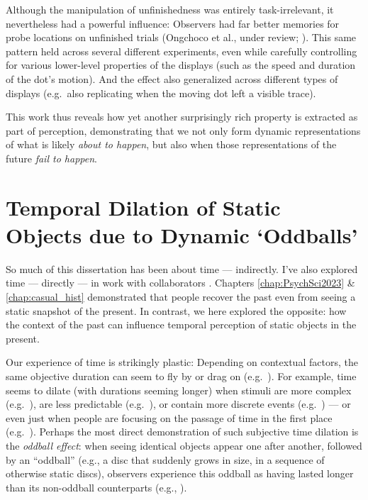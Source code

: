 Although the manipulation of unfinishedness was entirely task-irrelevant, it nevertheless had a powerful influence: Observers had far better memories for probe locations on unfinished trials (Ongchoco et al., under review; \cite{ongchoco_unfinishedness_2023}).  This same pattern held across several different experiments, even while carefully controlling for various lower-level properties of the displays (such as the speed and duration of the dot's motion). And the effect also generalized across different types of displays (e.g.~also replicating when the moving dot left a visible trace).  

This work thus reveals how yet another surprisingly rich property is extracted as part of perception, demonstrating that we not only form dynamic representations of what is likely \textit{about to happen}, but also when those representations of the future \textit{fail to happen}.  

\section{Temporal Dilation of Static Objects due to Dynamic ‘Oddballs’}

So much of this dissertation has been about time --- indirectly.  I’ve also explored time --- directly --- in work with collaborators \parencite{ongchoco_whats_2024}.  Chapters \ref{chap:PsychSci2023} \& \ref{chap:casual_hist} demonstrated that people recover the past even from seeing a static snapshot of the present.  In contrast, we here explored the opposite: how the context of the past can influence temporal perception of static objects in the present.  

Our experience of time is strikingly plastic: Depending on contextual factors, the same objective duration can seem to fly by or drag on (e.g.~\cite{eagleman_human_2008, grondin_timing_2010, matthews_time_2014}). For example, time seems to dilate (with durations seeming longer) when stimuli are more complex (e.g.~\cite{block_troubles_1978}), are less predictable (e.g.~\cite{pariyadath_brief_2008}), or contain more discrete events (e.g.~\cite{liverence_discrete_2012}) --- or even just when people are focusing on the passage of time in the first place (e.g.~\cite{macar_controlled_1994}).  Perhaps the most direct demonstration of such subjective time dilation is the \textit{oddball effect}: when seeing identical objects appear one after another, followed by an “oddball” (e.g., a disc that suddenly grows in size, in a sequence of otherwise static discs), observers experience this oddball as having lasted longer than its non-oddball counterparts (e.g., \cite{tse_attention_2004}). 

